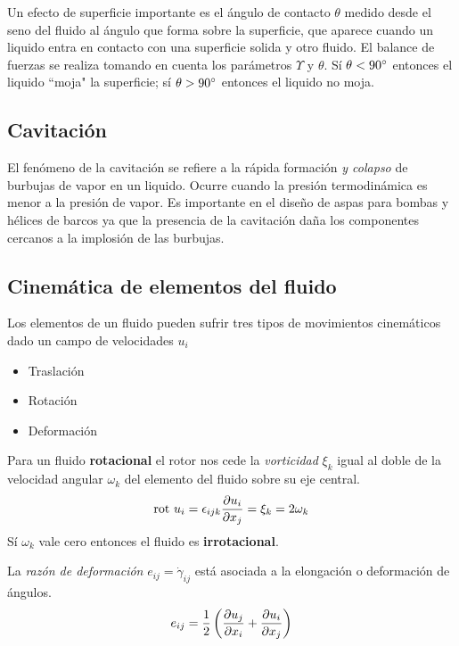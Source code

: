 Un efecto de superficie importante es el ángulo de contacto $\theta$ medido desde el seno del fluido al ángulo que forma sobre la superficie, que aparece cuando un liquido entra en contacto con una superficie solida y otro fluido. El balance de fuerzas se realiza tomando en cuenta los parámetros $\Upsilon$ y $\theta$. Sí $\theta<90^{\circ}$ entonces el liquido ``moja" la superficie; sí $\theta>90^{\circ}$ entonces el liquido no moja.%
\subsection{Cavitación}
El fenómeno de la cavitación se refiere a la rápida formación \textit{y colapso} de burbujas de vapor en un liquido. Ocurre cuando la presión termodinámica es menor a la presión de vapor. Es importante en el diseño de aspas para bombas y hélices de barcos ya que la presencia de la cavitación daña los componentes cercanos a la implosión de las burbujas.

\subsection{Cinemática de elementos del fluido} \label{sec:CinematicaDeElementosdeFluido}
Los elementos de un fluido pueden sufrir tres tipos de movimientos cinemáticos dado un campo de velocidades $u_i$ 
\begin{itemize}
    \item Traslación
    \item Rotación
    \item Deformación
\end{itemize}

Para un fluido \textbf{rotacional} el rotor nos cede la \textit{vorticidad} $\xi_k$ igual al doble de la velocidad angular $\omega_k$ del elemento del fluido sobre su eje central.
\begin{equation}
    \textrm{rot } u_i =\epsilon_{ijk}\frac{\partial u_i}{\partial x_j}=\xi_k= 2\omega_k 
\end{equation}
Sí $\omega_k$ vale cero entonces el fluido es \textbf{irrotacional}. 

La \textit{razón de deformación} $e_{ij}=\dot{\gamma}_{ij}$ está asociada a la elongación o deformación de ángulos. \begin{equation}
    e_{ij}=\frac{1}{2}\left( \frac{\partial u_j}{\partial x_i}+\frac{\partial u_i}{\partial x_j}\right)
\end{equation}

